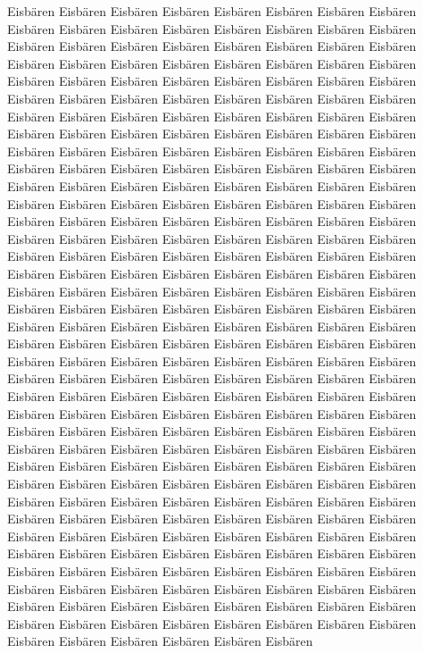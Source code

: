 \documentclass[a4paper, twoside, 12pt]{report}
\begin{document}
Eisb\"aren Eisb\"aren Eisb\"aren Eisb\"aren Eisb\"aren Eisb\"aren Eisb\"aren Eisb\"aren Eisb\"aren Eisb\"aren Eisb\"aren Eisb\"aren Eisb\"aren Eisb\"aren Eisb\"aren Eisb\"aren Eisb\"aren Eisb\"aren Eisb\"aren Eisb\"aren Eisb\"aren Eisb\"aren Eisb\"aren Eisb\"aren Eisb\"aren Eisb\"aren Eisb\"aren Eisb\"aren Eisb\"aren Eisb\"aren Eisb\"aren Eisb\"aren Eisb\"aren Eisb\"aren Eisb\"aren Eisb\"aren Eisb\"aren Eisb\"aren Eisb\"aren Eisb\"aren Eisb\"aren Eisb\"aren Eisb\"aren Eisb\"aren Eisb\"aren Eisb\"aren Eisb\"aren Eisb\"aren Eisb\"aren Eisb\"aren Eisb\"aren Eisb\"aren Eisb\"aren Eisb\"aren Eisb\"aren Eisb\"aren Eisb\"aren Eisb\"aren Eisb\"aren Eisb\"aren Eisb\"aren Eisb\"aren Eisb\"aren Eisb\"aren Eisb\"aren Eisb\"aren Eisb\"aren Eisb\"aren Eisb\"aren Eisb\"aren Eisb\"aren Eisb\"aren Eisb\"aren Eisb\"aren Eisb\"aren Eisb\"aren Eisb\"aren Eisb\"aren Eisb\"aren Eisb\"aren Eisb\"aren  Eisb\"aren Eisb\"aren Eisb\"aren Eisb\"aren Eisb\"aren Eisb\"aren Eisb\"aren Eisb\"aren Eisb\"aren Eisb\"aren Eisb\"aren Eisb\"aren Eisb\"aren Eisb\"aren Eisb\"aren Eisb\"aren Eisb\"aren Eisb\"aren Eisb\"aren Eisb\"aren Eisb\"aren Eisb\"aren Eisb\"aren Eisb\"aren Eisb\"aren Eisb\"aren Eisb\"aren Eisb\"aren Eisb\"aren Eisb\"aren Eisb\"aren Eisb\"aren Eisb\"aren Eisb\"aren Eisb\"aren Eisb\"aren Eisb\"aren Eisb\"aren Eisb\"aren Eisb\"aren Eisb\"aren Eisb\"aren Eisb\"aren Eisb\"aren Eisb\"aren Eisb\"aren Eisb\"aren Eisb\"aren Eisb\"aren Eisb\"aren Eisb\"aren Eisb\"aren Eisb\"aren Eisb\"aren Eisb\"aren Eisb\"aren Eisb\"aren Eisb\"aren Eisb\"aren Eisb\"aren Eisb\"aren Eisb\"aren Eisb\"aren Eisb\"aren Eisb\"aren Eisb\"aren Eisb\"aren Eisb\"aren Eisb\"aren Eisb\"aren Eisb\"aren Eisb\"aren Eisb\"aren Eisb\"aren Eisb\"aren Eisb\"aren Eisb\"aren Eisb\"aren Eisb\"aren Eisb\"aren Eisb\"aren Eisb\"aren Eisb\"aren Eisb\"aren Eisb\"aren Eisb\"aren Eisb\"aren Eisb\"aren Eisb\"aren Eisb\"aren Eisb\"aren Eisb\"aren Eisb\"aren Eisb\"aren Eisb\"aren Eisb\"aren Eisb\"aren Eisb\"aren Eisb\"aren Eisb\"aren  Eisb\"aren Eisb\"aren Eisb\"aren Eisb\"aren Eisb\"aren Eisb\"aren Eisb\"aren Eisb\"aren Eisb\"aren Eisb\"aren Eisb\"aren Eisb\"aren Eisb\"aren Eisb\"aren Eisb\"aren Eisb\"aren Eisb\"aren Eisb\"aren Eisb\"aren Eisb\"aren Eisb\"aren Eisb\"aren Eisb\"aren Eisb\"aren Eisb\"aren Eisb\"aren Eisb\"aren Eisb\"aren Eisb\"aren Eisb\"aren Eisb\"aren Eisb\"aren Eisb\"aren Eisb\"aren Eisb\"aren Eisb\"aren Eisb\"aren Eisb\"aren Eisb\"aren Eisb\"aren Eisb\"aren Eisb\"aren Eisb\"aren Eisb\"aren Eisb\"aren Eisb\"aren Eisb\"aren Eisb\"aren Eisb\"aren Eisb\"aren Eisb\"aren Eisb\"aren Eisb\"aren Eisb\"aren Eisb\"aren Eisb\"aren Eisb\"aren Eisb\"aren Eisb\"aren Eisb\"aren Eisb\"aren Eisb\"aren Eisb\"aren Eisb\"aren Eisb\"aren Eisb\"aren Eisb\"aren Eisb\"aren Eisb\"aren Eisb\"aren Eisb\"aren Eisb\"aren Eisb\"aren Eisb\"aren Eisb\"aren Eisb\"aren Eisb\"aren Eisb\"aren Eisb\"aren Eisb\"aren Eisb\"aren Eisb\"aren Eisb\"aren Eisb\"aren Eisb\"aren Eisb\"aren Eisb\"aren Eisb\"aren Eisb\"aren Eisb\"aren Eisb\"aren Eisb\"aren Eisb\"aren Eisb\"aren Eisb\"aren Eisb\"aren Eisb\"aren Eisb\"aren Eisb\"aren Eisb\"aren  Eisb\"aren Eisb\"aren Eisb\"aren Eisb\"aren Eisb\"aren Eisb\"aren Eisb\"aren Eisb\"aren Eisb\"aren Eisb\"aren Eisb\"aren Eisb\"aren Eisb\"aren 
\end{document}
